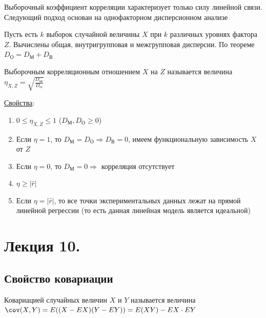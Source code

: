 \documentclass[12pt]{article}
\begin{document}
\hypertarget{selective_correlational_relation}{}

Выборочный коэффициент корреляции характеризует только силу линейной связи. Следующий подход основан на однофакторном дисперсионном анализе

Пусть есть $k$ выборок случайной величины $X$ при $k$ различных уровнях фактора $Z$. Вычислены общая, внутригрупповая и межгрупповая дисперсии. 
По теореме $D_\text{О} = D_\text{М} + D_\text{В}$

\Def Выборочным корреляционным отношением $X$ на $Z$ называется величина $\eta_{X, Z} = \sqrt{\frac{D_\text{М}}{D_\text{О}}}$

\underline{Свойства}:

\begin{enumerate}
    \item $0 \leq \eta_{X, Z} \leq 1$ ($D_\text{М}, D_\text{О} \geq 0$)

    \item Если $\eta = 1$, то $D_\text{М} = D_\text{О} \Longrightarrow D_\text{В} = 0$, имеем функциональную зависимость $X$ от $Z$

    \item Если $\eta = 0$, то $D_\text{М} = 0 \Longrightarrow$ корреляция отсутствует

    \item $\eta \geq |\hat r|$

    \item Если $\eta = |\hat r|$, то все точки экспериментальных данных лежат на прямой линейной регрессии 
    (то есть данная линейная модель является идеальной)

\end{enumerate}







\section{Лекция 10.}

\subsection{Свойство ковариации}

\Mem Ковариацией случайных величин $X$ и $Y$ называется величина $\cov (X, Y) = E((X - EX)(Y - EY)) = E(XY) - EX \cdot EY$
\end{document}
